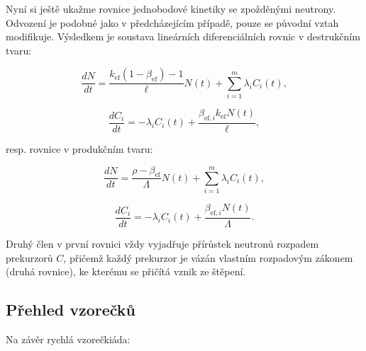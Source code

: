 Nyní si ještě ukažme rovnice jednobodové kinetiky se zpožděnými neutrony. Odvození je podobné jako v předcházejícím případě, pouze se původní vztah modifikuje. Výsledkem je soustava lineárních diferenciálních rovnic v destrukčním tvaru:

\begin{equation}
  \boxed{
  \dfrac{dN}{dt} = \dfrac{k_{\text{ef}}(1-\beta_{\text{ef}})-1}{\ell} N(t) + \sum_{i=1}^m \lambda_i C_i(t),
  \label{rovnice_kinetiky_zpozdenky_1}}
\end{equation}

\begin{equation}
  \boxed{
  \dfrac{dC_i}{dt} = -\lambda_i C_i(t) + \dfrac{\beta_{\text{ef},i} k_{\text{ef}} N(t)}{\ell},
  \label{rovnice_kinetiky_zpozdenky_2}}
\end{equation}

resp. rovnice v produkčním tvaru:

\begin{equation}
  \boxed{
  \dfrac{dN}{dt} = \dfrac{\rho - \beta_{\text{ef}}}{\Lambda} N(t) + \sum_{i=1}^m \lambda_i C_i(t),
  \label{rovnice_kinetiky_zpozdenky_3}}
\end{equation}

\begin{equation}
  \boxed{
  \dfrac{dC_i}{dt} = -\lambda_i C_i(t) + \dfrac{\beta_{\text{ef},i}  N(t)}{\Lambda}.
  \label{rovnice_kinetiky_zpozdenky_4}}
\end{equation}

Druhý člen v první rovnici vždy vyjadřuje přírůstek neutronů rozpadem prekurzorů $C$, přičemž každý prekurzor je vázán vlastním rozpadovým zákonem (druhá rovnice), ke kterému se přičítá vznik ze štěpení.

\subsection{Přehled vzorečků}

Na závěr rychlá vzorečkiáda:

